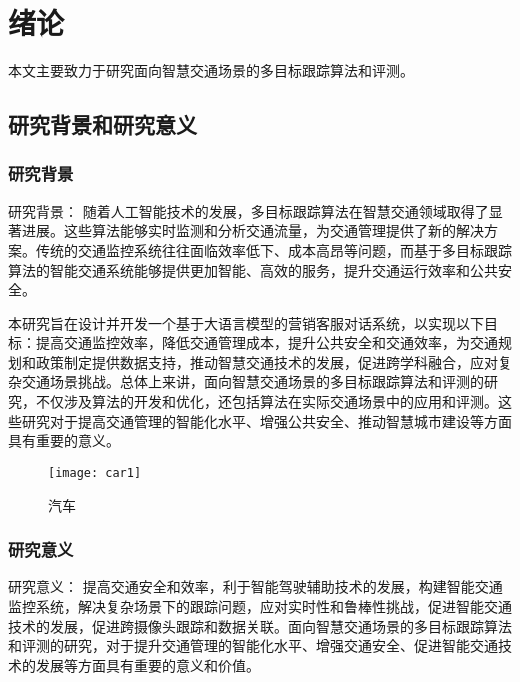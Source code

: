 \chapter{绪论}

本文主要致力于研究面向智慧交通场景的多目标跟踪算法和评测。

\section{研究背景和研究意义}

\subsection{研究背景}

研究背景：
随着人工智能技术的发展，多目标跟踪算法在智慧交通领域取得了显著进展。这些算法能够实时监测和分析交通流量，为交通管理提供了新的解决方案。传统的交通监控系统往往面临效率低下、成本高昂等问题，而基于多目标跟踪算法的智能交通系统能够提供更加智能、高效的服务，提升交通运行效率和公共安全。

本研究旨在设计并开发一个基于大语言模型的营销客服对话系统，以实现以下目标：提高交通监控效率，降低交通管理成本，提升公共安全和交通效率，为交通规划和政策制定提供数据支持，推动智慧交通技术的发展，促进跨学科融合，应对复杂交通场景挑战。总体上来讲，面向智慧交通场景的多目标跟踪算法和评测的研究，不仅涉及算法的开发和优化，还包括算法在实际交通场景中的应用和评测。这些研究对于提高交通管理的智能化水平、增强公共安全、推动智慧城市建设等方面具有重要的意义。


\begin{figure}[htbp] %
	\centering
	\texttt{[image: car1]} %
	\caption{汽车} %
	\label{fig:car1} %
\end{figure}



\subsection{研究意义}

研究意义：
提高交通安全和效率，利于智能驾驶辅助技术的发展，构建智能交通监控系统，解决复杂场景下的跟踪问题，应对实时性和鲁棒性挑战，促进智能交通技术的发展，促进跨摄像头跟踪和数据关联。面向智慧交通场景的多目标跟踪算法和评测的研究，对于提升交通管理的智能化水平、增强交通安全、促进智能交通技术的发展等方面具有重要的意义和价值。


